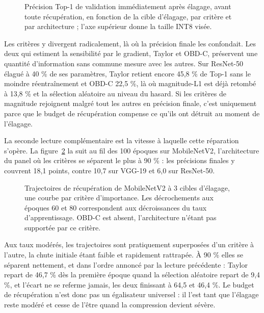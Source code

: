 \documentclass[11pt,a4paper]{report}
\begin{document}
\begin{figure}[H]
    \centering
    
    \caption{Précision Top-1 de validation immédiatement après élagage, avant toute récupération, en fonction de la cible d'élagage, par critère et par architecture ; l'axe supérieur donne la taille INT8 visée.}
    \label{fig:post_prune}
\end{figure}

Les critères y divergent radicalement, là où la précision finale les confondait. Les deux qui estiment la sensibilité par le gradient, Taylor et OBD-C, préservent une quantité d'information sans commune mesure avec les autres. Sur ResNet-50 élagué à 40 \% de ses paramètres, Taylor retient encore 45,8 \% de Top-1 sans le moindre réentraînement et OBD-C 22,5 \%, là où magnitude-L1 est déjà retombé à 13,8 \% et la sélection aléatoire au niveau du hasard. Si les critères de magnitude rejoignent malgré tout les autres en précision finale, c'est uniquement parce que le budget de récupération compense ce qu'ils ont détruit au moment de l'élagage.

La seconde lecture complémentaire est la vitesse à laquelle cette réparation s'opère. La figure~\ref{fig:ft_traj} la suit au fil des 100 époques sur MobileNetV2, l'architecture du panel où les critères se séparent le plus à 90 \% : les précisions finales y couvrent 18,1 points, contre 10,7 sur VGG-19 et 6,0 sur ResNet-50.

\begin{figure}[H]
    \centering
    
    \caption{Trajectoires de récupération de MobileNetV2 à 3 cibles d'élagage, une courbe par critère d'importance. Les décrochements aux époques 60 et 80 correspondent aux décroissances du taux d'apprentissage. OBD-C est absent, l'architecture n'étant pas supportée par ce critère.}
    \label{fig:ft_traj}
\end{figure}

Aux taux modérés, les trajectoires sont pratiquement superposées d'un critère à l'autre, la chute initiale étant faible et rapidement rattrapée. À 90 \% elles se séparent nettement, et dans l'ordre annoncé par la lecture précédente : Taylor repart de 46,7 \% dès la première époque quand la sélection aléatoire repart de 9,4 \%, et l'écart ne se referme jamais, les deux finissant à 64,5 et 46,4 \%. Le budget de récupération n'est donc pas un égalisateur universel : il l'est tant que l'élagage reste modéré et cesse de l'être quand la compression devient sévère.
\end{document}
